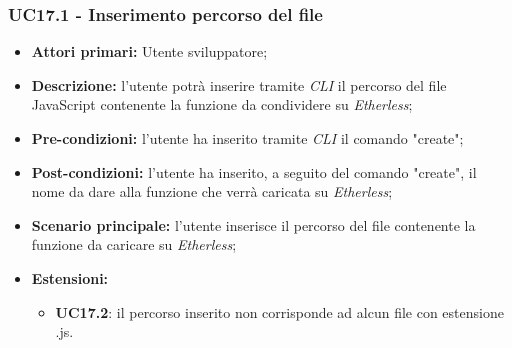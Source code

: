 \subsubsection{UC17.1 - Inserimento percorso del file}
\begin{itemize}
	\item \textbf{Attori primari:} Utente sviluppatore;
	\item \textbf{Descrizione:} l'utente potrà inserire tramite \textit{CLI\glo} il percorso del file JavaScript contenente la funzione da condividere su \textit{Etherless}; 
	\item \textbf{Pre-condizioni:} l'utente ha inserito tramite \textit{CLI\glo} il comando "create";
	\item \textbf{Post-condizioni:} l'utente ha inserito, a seguito del comando "create", il nome da dare alla funzione che verrà caricata su \textit{Etherless};
	\item \textbf{Scenario principale:} l'utente inserisce il percorso del file contenente la funzione da caricare su \textit{Etherless};
	\item \textbf{Estensioni:} 
	\begin{itemize}
		\item \textbf{UC17.2}: il percorso inserito non corrisponde ad alcun file con estensione .js.
	\end{itemize}
\end{itemize}
